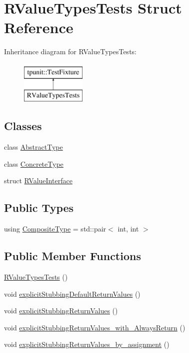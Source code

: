 \hypertarget{structRValueTypesTests}{}\section{R\+Value\+Types\+Tests Struct Reference}
\label{structRValueTypesTests}
Inheritance diagram for R\+Value\+Types\+Tests\+:\begin{figure}[H]
\begin{center}
\leavevmode
\includegraphics[height=2.000000cm]{structRValueTypesTests}
\end{center}
\end{figure}
\subsection*{Classes}
\begin{DoxyCompactItemize}
\item 
class \mbox{\hyperlink{classRValueTypesTests_1_1AbstractType}{Abstract\+Type}}
\item 
class \mbox{\hyperlink{classRValueTypesTests_1_1ConcreteType}{Concrete\+Type}}
\item 
struct \mbox{\hyperlink{structRValueTypesTests_1_1RValueInterface}{R\+Value\+Interface}}
\end{DoxyCompactItemize}
\subsection*{Public Types}
\begin{DoxyCompactItemize}
\item 
using \mbox{\hyperlink{structRValueTypesTests_ae0674508758cee5fa643063720d87a20}{Composite\+Type}} = std\+::pair$<$ int, int $>$
\end{DoxyCompactItemize}
\subsection*{Public Member Functions}
\begin{DoxyCompactItemize}
\item 
\mbox{\hyperlink{structRValueTypesTests_a31cd204820774ca75a41a87b9abb7a50}{R\+Value\+Types\+Tests}} ()
\item 
void \mbox{\hyperlink{structRValueTypesTests_a0b9189d9d0aa5b89142bf02a974483c1}{explicit\+Stubbing\+Default\+Return\+Values}} ()
\item 
void \mbox{\hyperlink{structRValueTypesTests_a5800f9a28f79309e17e417ace620933d}{explicit\+Stubbing\+Return\+Values}} ()
\item 
void \mbox{\hyperlink{structRValueTypesTests_ab6aff1fccc24bdbc7b8e88cddca8f6ce}{explicit\+Stubbing\+Return\+Values\+\_\+with\+\_\+\+Always\+Return}} ()
\item 
void \mbox{\hyperlink{structRValueTypesTests_ac97aa72227c7496652adc5befd6582c8}{explicit\+Stubbing\+Return\+Values\+\_\+by\+\_\+assignment}} ()
\end{DoxyCompactItemize}
